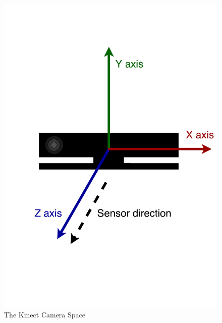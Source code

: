 \begin{figure}[!h]
  \centering

  \includegraphics[width=0.5\linewidth]{figs/kinect_camera_space}
  
  \caption{The Kinect Camera Space}
  
  \label{fig:kinect_camera_space}
\end{figure}


